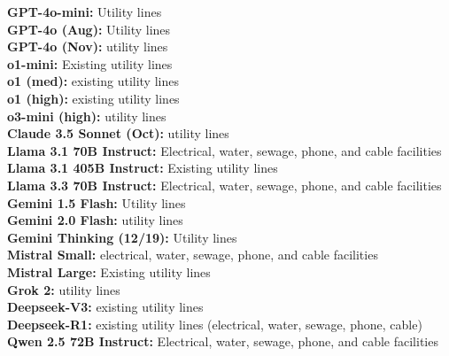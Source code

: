 \begin{tcolorbox}[colback=gray!3, colframe=gray!50, arc=2mm, boxrule=0.5pt, title={\textit{SQuAD2.0}}, coltitle=black, colbacktitle=gray!20]
    \textbf{GPT-4o-mini:} Utility lines\\
    \textbf{GPT-4o (Aug):} Utility lines\\
    \textbf{GPT-4o (Nov):} utility lines\\
    \textbf{o1-mini:} Existing utility lines\\
    \textbf{o1 (med):} existing utility lines\\
    \textbf{o1 (high):} existing utility lines\\
    \textbf{o3-mini (high):} utility lines\\
    \textbf{Claude 3.5 Sonnet (Oct):} utility lines\\
    \textbf{Llama 3.1 70B Instruct:} Electrical, water, sewage, phone, and cable facilities \\
    \textbf{Llama 3.1 405B Instruct:} Existing utility lines \\
    \textbf{Llama 3.3 70B Instruct:} Electrical, water, sewage, phone, and cable facilities \\
    \textbf{Gemini 1.5 Flash:} Utility lines \\
    \textbf{Gemini 2.0 Flash:} utility lines \\
    \textbf{Gemini Thinking (12/19):} Utility lines \\
    \textbf{Mistral Small:} electrical, water, sewage, phone, and cable facilities \\
    \textbf{Mistral Large:} Existing utility lines\\
    \textbf{Grok 2:} utility lines\\
    \textbf{Deepseek-V3:} existing utility lines\\
    \textbf{Deepseek-R1:}  existing utility lines (electrical, water, sewage, phone, cable)\\
    \textbf{Qwen 2.5 72B Instruct:} Electrical, water, sewage, phone, and cable facilities \\

\end{tcolorbox}



